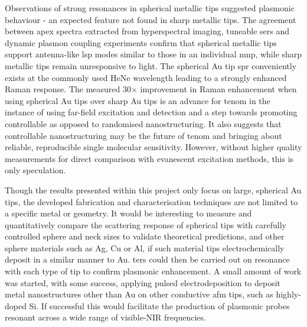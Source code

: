 \documentclass[12pt, a4paper, oneside]{book}
\begin{document}
Observations of strong resonances in spherical metallic tips suggested plasmonic behaviour - an expected feature not found in sharp metallic tips. The agreement between apex spectra extracted from hyperspectral imaging, tuneable \gls{sers} and dynamic plasmon coupling experiments confirm that spherical metallic tips support antenna-like \gls{lsp} modes similar to those in an individual \gls{mnp}, while sharp metallic tips remain unresponsive to light. The spherical Au tip \gls{spr} conveniently exists at the commonly used HeNe wavelength leading to a strongly enhanced Raman response. The measured 30$\times$ improvement in Raman enhancement when using spherical Au tips over sharp Au tips is an advance for \gls{tenom} in the instance of using far-field excitation and detection and a step towards promoting controllable as opposed to randomised nanostructuring. It also suggests that controllable nanostructuring may be the future of \gls{tenom} and bringing about reliable, reproducible single molecular sensitivity. However, without higher quality measurements for direct comparison with evanescent excitation methods, this is only speculation.

Though the results presented within this project only focus on large, spherical Au tips, the developed fabrication and characterisation techniques are not limited to a specific metal or geometry. It would be interesting to measure and quantitatively compare the scattering response of spherical tips with carefully controlled sphere and neck sizes to validate theoretical predictions, and other sphere materials such as Ag, Cu or Al, if such material tips electrochemically deposit in a similar manner to Au. \Gls{ters} could then be carried out on resonance with each type of tip to confirm plasmonic enhancement. A small amount of work was started, with some success, applying pulsed electrodeposition to deposit metal nanostructures other than Au on other conductive \gls{afm} tips, such as highly-doped Si. If successful this would facilitate the production of plasmonic probes resonant across a wide range of visible-NIR frequencies.
\end{document}
